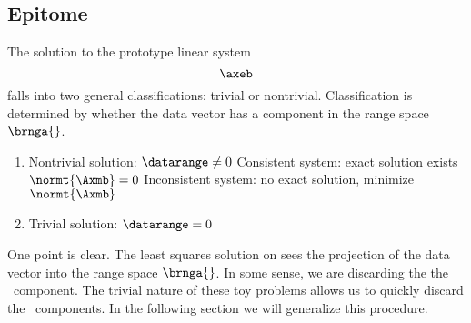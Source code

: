 \subsection{Epitome}
The solution to the prototype linear system
\begin{equation*}
  \axeb
\end{equation*}
falls into two general classifications: trivial or nontrivial. Classification is determined by whether the data vector has a component in the range space $\brnga{}$.
\begin{enumerate}
%
  \item Nontrivial solution: $\datarange \ne 0$
  \subitem Consistent system: exact solution exists $\normt{\Axmb} = 0$
  \subitem Inconsistent system: no exact solution, minimize $\normt{\Axmb}$
%
  \item Trivial solution: $\datarange = 0$
\end{enumerate}

One point is clear. The least squares solution on sees the projection of the data vector into the range space $\brnga{}$. In some sense, we are discarding the the \ns\ component. The trivial nature of these toy problems allows us to quickly discard the \ns\ components. In the following section we will generalize this procedure.


\endinput